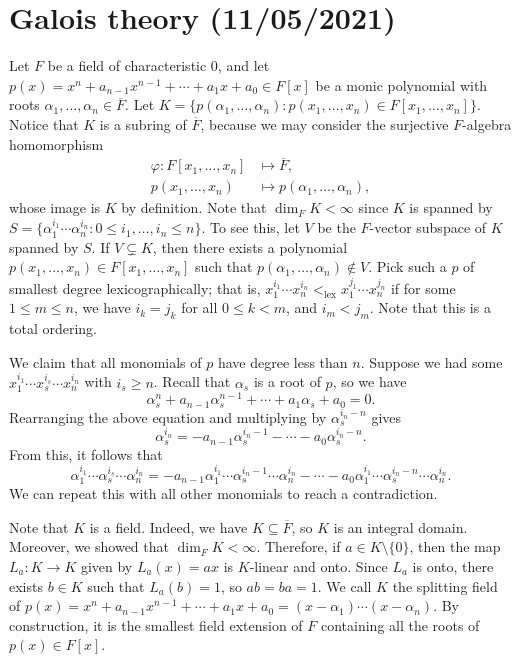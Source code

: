 \section{Galois theory (11/05/2021)}
Let $F$ be a field of characteristic $0$, and let $p(x) = x^n + a_{n-1} x^{n-1} 
+ \cdots + a_1 x + a_0 \in F[x]$ be a monic polynomial with roots $\alpha_1, 
\dots, \alpha_n \in \overline{F}$. Let $K = \{p(\alpha_1, \dots, \alpha_n) : 
p(x_1, \dots, x_n) \in F[x_1, \dots, x_n]\}$. Notice that $K$ is a subring of 
$\overline{F}$, because we may consider the surjective $F$-algebra homomorphism 
\begin{align*}
    \varphi : F[x_1, \dots, x_n] &\mapsto \overline{F}, \\ 
    p(x_1, \dots, x_n) &\mapsto p(\alpha_1, \dots, \alpha_n), 
\end{align*}
whose image is $K$ by definition. Note that $\dim_F K < \infty$ since $K$ 
is spanned by $S = \{\alpha_1^{i_1} \cdots \alpha_n^{i_n} : 0 \leq i_1, \dots, 
i_n \leq n\}$. To see this, let $V$ be the $F$-vector subspace of $K$ spanned 
by $S$. If $V \subsetneq K$, then there exists a polynomial $p(x_1, \dots, x_n) 
\in F[x_1, \dots, x_n]$ such that $p(\alpha_1, \dots, \alpha_n) \notin V$. 
Pick such a $p$ of smallest degree lexicographically; that is, 
$x_1^{i_1} \cdots x_n^{i_n} <_{\textrm{lex}} x_1^{j_1} \cdots x_n^{j_n}$ if for some 
$1 \leq m \leq n$, we have $i_k = j_k$ for all $0 \leq k < m$, and 
$i_m < j_m$. Note that this is a total ordering. 

We claim that all monomials of $p$ have degree less than $n$. Suppose we had 
some $x_1^{i_1} \cdots x_s^{i_s} \cdots x_n^{i_n}$ with $i_s \geq n$. Recall 
that $\alpha_s$ is a root of $p$, so we have 
\[ \alpha_s^n + a_{n-1} \alpha_s^{n-1} + \cdots + a_1 \alpha_s + a_0 = 0. \] 
Rearranging the above equation and multiplying by $\alpha_s^{i_n-n}$ gives 
\[ \alpha_s^{i_n} = -a_{n-1} \alpha_s^{i_n-1} - \cdots - a_0 \alpha_s^{i_n-n}. \] 
From this, it follows that 
\[ \alpha_1^{i_1} \cdots \alpha_s^{i_s} \cdots \alpha_n^{i_n} 
= -a_{n-1} \alpha_1^{i_1} \cdots \alpha_s^{i_n-1} \cdots \alpha_n^{i_n} 
- \cdots - a_0 \alpha_1^{i_1} \cdots \alpha_s^{i_n-n} \cdots \alpha_n^{i_n}. \] 
We can repeat this with all other monomials to reach a contradiction. 

Note that $K$ is a field. Indeed, we have $K \subseteq \overline{F}$, so $K$ is 
an integral domain. Moreover, we showed that $\dim_F K < \infty$. Therefore, 
if $a \in K \setminus \{0\}$, then the map $L_a : K \to K$ given by 
$L_a(x) = ax$ is $K$-linear and onto. Since $L_a$ is onto, there exists $b \in K$ 
such that $L_a(b) = 1$, so $ab = ba = 1$. We call $K$ the splitting field
of $p(x) = x^n + a_{n-1} x^{n-1} + \cdots + a_1 x + a_0 = (x - \alpha_1) 
\cdots (x- \alpha_n)$. By construction, it is the smallest field extension of $F$
containing all the roots of $p(x) \in F[x]$. 

